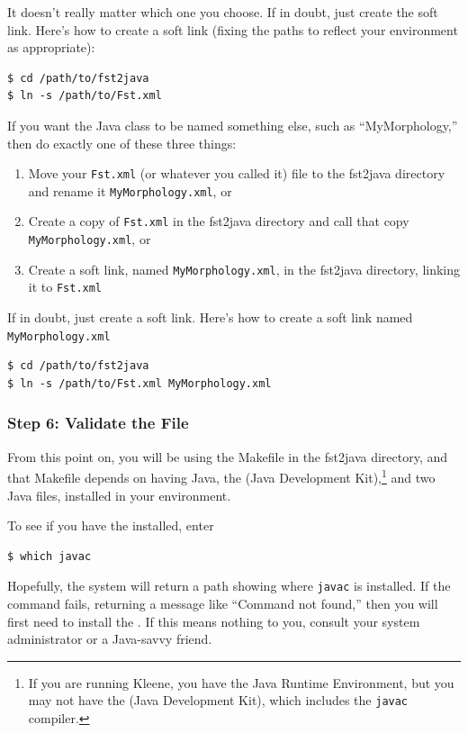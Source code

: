 \noindent
It doesn't really matter which one you choose.  If in doubt, just create
the soft link.  Here's how to create a soft link (fixing the paths to reflect your environment as
appropriate):

\begin{Verbatim}
$ cd /path/to/fst2java
$ ln -s /path/to/Fst.xml
\end{Verbatim}

If you want the Java class to be named something else, such as
``MyMorphology,'' then do exactly one of these three things:

\begin{enumerate}
\item
Move your \texttt{Fst.xml} (or whatever you called it) file to the
	fst2java directory and rename it \texttt{MyMorphology.xml}, or
\item
Create a copy of \texttt{Fst.xml} in the fst2java directory and call that
	copy \texttt{MyMorphology.xml}, or
\item
Create a soft link, named \texttt{MyMorphology.xml}, in the fst2java directory, 
linking it to \texttt{Fst.xml}
\end{enumerate}

\noindent
If in doubt, just create a soft link.  Here's how to create a soft link
named \texttt{MyMorphology.xml}

\begin{Verbatim}
$ cd /path/to/fst2java
$ ln -s /path/to/Fst.xml MyMorphology.xml
\end{Verbatim}

\subsubsection{Step 6: Validate the \xml{} File}

From this point on, you will be using the Makefile in the fst2java directory, and that Makefile depends on
having Java, the  (Java Development Kit),\footnote{If you are running Kleene, you have the  Java Runtime
Environment, but you may not have the  (Java Development Kit), which includes the
\texttt{javac} compiler.} and two Java  files, installed in your environment.

To see if you have the  installed, enter

\begin{Verbatim}
$ which javac
\end{Verbatim}

\noindent
Hopefully, the system will return a path showing where \texttt{javac} is installed.  If the command fails, returning a message like
``Command not found,'' then you will first need to install the .  If
this means nothing to you, consult your system administrator or a Java-savvy friend.

